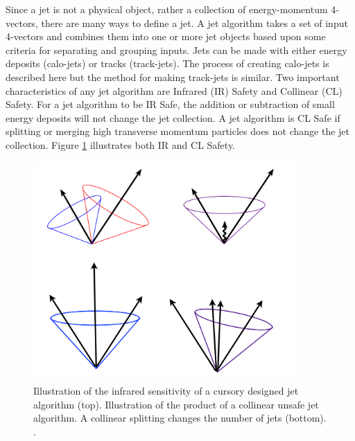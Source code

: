 \indent Since a jet is not a physical object, rather a collection of energy-momentum 4-vectors, there are many ways to define a jet. A jet algorithm takes a set of input 4-vectors and combines them into one or more jet objects based upon some criteria for separating and grouping inputs. Jets can be made with either energy deposits (calo-jets) or tracks (track-jets). The process of creating calo-jets is described here but the method for making track-jets is similar.  Two important characteristics of any jet algorithm are Infrared (IR) Safety and Collinear (CL) Safety. For a jet algorithm to be IR Safe, the addition or subtraction of small energy deposits will not change the jet collection. A jet algorithm is CL Safe if splitting or merging high transverse momentum particles does not change the jet collection. Figure \ref{fig:IR_CL} illustrates both IR and CL Safety.

\begin{figure}[h]
\begin{center}
\includegraphics*[width=0.90\textwidth] {figures/IR_CL_safe}
\caption[Illustration of Infrared and collinear safety]{Illustration of the infrared sensitivity of a cursory designed jet algorithm (top). Illustration of the product of a collinear unsafe jet algorithm. A collinear splitting changes the number of jets (bottom). \cite{Isildak:2013kfa}.}
\label{fig:IR_CL}
\end{center}
\end{figure}

